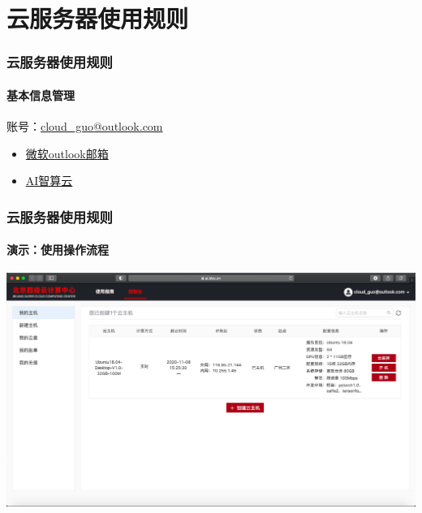 \documentclass[10pt]{beamer}
\begin{document}
    \section{云服务器使用规则}
        \begin{frame}
            \frametitle{云服务器使用规则}
                \framesubtitle{基本信息管理}
                    账号：\href{mailto: cloud\_guo@outlook.com}{cloud\_guo@outlook.com} \\
                    \hspace*{\fill}
                    \begin{itemize}
                        \item {\href{https://outlook.live.com/owa/}{微软outlook邮箱}}
                        \item {\href{https://ai.blsc.cn/\#/login}{AI智算云}}
                    \end{itemize}

        \end{frame}

        \begin{frame}
            \frametitle{云服务器使用规则}
                \framesubtitle{演示：使用操作流程}
                    \centering

                    \hyperlink{https://ai.blsc.cn/\#/cloud/compute}{
                        \includegraphics[width=\textwidth]{src/img/Console.png}
                        }

        \end{frame}
\end{document}
